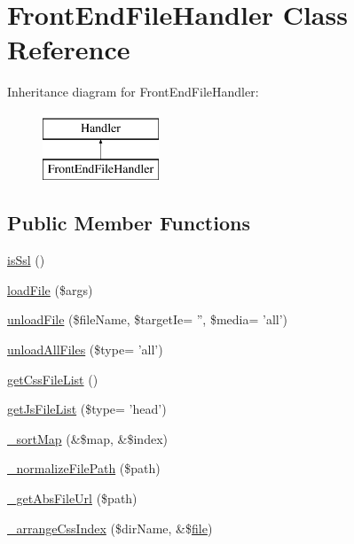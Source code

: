 \hypertarget{classFrontEndFileHandler}{\section{Front\-End\-File\-Handler Class Reference}
\label{classFrontEndFileHandler}
}
Inheritance diagram for Front\-End\-File\-Handler\-:\begin{figure}[H]
\begin{center}
\leavevmode
\includegraphics[height=2.000000cm]{classFrontEndFileHandler}
\end{center}
\end{figure}
\subsection*{Public Member Functions}
\begin{DoxyCompactItemize}
\item 
\hyperlink{classFrontEndFileHandler_a2bd70c621572f784c4e563d0dafa0fc2}{is\-Ssl} ()
\item 
\hyperlink{classFrontEndFileHandler_aeb802ae7b7b315da73ec3be224ce9e9f}{load\-File} (\$args)
\item 
\hyperlink{classFrontEndFileHandler_ad55bc752b0d140bbfefaaa30057db3d2}{unload\-File} (\$file\-Name, \$target\-Ie= '', \$media= 'all')
\item 
\hyperlink{classFrontEndFileHandler_ad118128391da5bb33e4a7105152432bc}{unload\-All\-Files} (\$type= 'all')
\item 
\hyperlink{classFrontEndFileHandler_a35cff5fb32625790d01e8839c73fd0fc}{get\-Css\-File\-List} ()
\item 
\hyperlink{classFrontEndFileHandler_ab6147b1dac393bc3838d433f3c46553f}{get\-Js\-File\-List} (\$type= 'head')
\item 
\hyperlink{classFrontEndFileHandler_a3677abdd2a1a3a17fd1de9f58ffe27a5}{\-\_\-sort\-Map} (\&\$map, \&\$index)
\item 
\hyperlink{classFrontEndFileHandler_a4818293d9395dd1b4d62b8cabeb04603}{\-\_\-normalize\-File\-Path} (\$path)
\item 
\hyperlink{classFrontEndFileHandler_a0a76e82d6037ea9a862e1585b2e562df}{\-\_\-get\-Abs\-File\-Url} (\$path)
\item 
\hyperlink{classFrontEndFileHandler_aedfe6ba984a8e33de211ef23e83cd98e}{\-\_\-arrange\-Css\-Index} (\$dir\-Name, \&\$\hyperlink{classfile}{file})
\end{DoxyCompactItemize}
